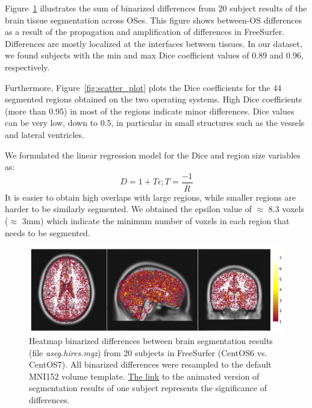 \documentclass[a4paper,num-refs]{oup-contemporary}
\begin{document}
Figure~\ref{fig:tissue_class} illustrates the sum of binarized differences 
from 20 subject results of the brain tissue segmentation across OSes.
This figure shows between-OS differences  
as a result of the propagation and amplification of differences in FreeSurfer. 
Differences are mostly localized at the interfaces between tissues.
In our dataset, we found subjects with the min and max Dice coefficient 
values of 0.89 and 0.96, respectively.

Furthermore, Figure~\ref{fig:scatter_plot} plots the Dice coefficients 
for the 44 segmented regions obtained on the two operating systems.
High Dice coefficients (more than 0.95) in most of the regions indicate minor differences.
Dice values can be very low, down to 0.5, in particular in small structures 
such as the vessels and lateral ventricles.

We formulated the linear regression model for the Dice and region size variables as:
\[D=1 + T\epsilon ;    T=\frac{-1}{\overline{R}}\]
It is easier to obtain high overlaps with large regions, 
while smaller regions are harder to be similarly segmented.
We obtained the epsilon value of $\approx$ 8.3 voxels ($\approx$ 3mm) which indicate the minimum number
of voxels in each region that needs to be segmented.



\begin{figure}
\centering
  \includegraphics[width=\columnwidth]{images/brain_segmentation_mni.png} 
  \caption{Heatmap binarized differences between brain segmentation results (file \emph{aseg.hires.mgz}) from 
          20 subjects in FreeSurfer (CentOS6 vs. CentOS7). 
          All binarized differences were resampled to the default MNI152 volume template.
          \href{https://github.com/ali4006/HCP-reproducibility-paper/blob/master/images/fs_brain_segmentation.gif}
          {The link} to the animated version of segmentation results of one subject represents the significance of differences.} 
  \label{fig:tissue_class}
\end{figure}
\end{document}
